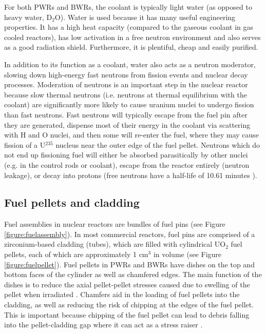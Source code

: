 For both PWRs and BWRs, the coolant is typically light water (as opposed to heavy water, D$_{2}$O). Water is used because it has many useful engineering properties. It has a high heat capacity (compared to the gaseous coolant in gas cooled reactors), has low activation in a free neutron environment and also serves as a good radiation shield. Furthermore, it is plentiful, cheap and easily purified.

In addition to its function as a coolant, water also acts as a neutron moderator, slowing down high-energy fast neutrons from fission events and nuclear decay processes. Moderation of neutrons is an important step in the nuclear reactor because slow thermal neutrons (i.e. neutrons at thermal equilibrium with the coolant) are significantly more likely to cause uranium nuclei to undergo fission than fast neutrons. Fast neutrons will typically escape from the fuel pin after they are generated, dispense most of their energy in the coolant via scattering with H and O nuclei, and then some will re-enter the fuel, where they may cause fission of a U$^{235}$ nucleus near the outer edge of the fuel pellet. Neutrons which do not end up fissioning fuel will either be absorbed parasitically by other nuclei (e.g. in the control rods or coolant), escape from the reactor entirely (neutron leakage), or decay into protons (free neutrons have a half-life of 10.61 minutes \cite{Christensen1972}).

\subsection{Fuel pellets and cladding} \label{ss_fuelpin}

Fuel assemblies in nuclear reactors are bundles of fuel pins (see Figure \ref{figure:fuelassembly}). In most commercial reactors, fuel pins are comprised of a zirconium-based cladding (tubes), which are filled with cylindrical UO$_{2}$ fuel pellets, each of which are approximately 1 cm$^{3}$ in volume (see Figure \ref{figure:fuelpellet}). Fuel pellets in PWRs and BWRs have dishes on the top and bottom faces of the cylinder as well as chamfered edges. The main function of the dishes is  to reduce the axial pellet-pellet stresses caused due to swelling of the pellet when irradiated \cite{marino2005crack}. Chamfers aid in the loading of fuel pellets into the cladding, as well as reducing the risk of chipping at the edges of the fuel pellet. This is important because chipping of the fuel pellet can lead to debris falling into the pellet-cladding gap where it can act as a stress raiser \cite{doerr2015nuclear}.

